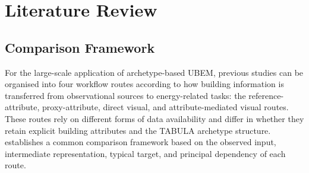 \chapter{Literature Review}
\label{ch:literature_review}

\section{Comparison Framework}
\label{sec:comparison_framework}

For the large-scale application of archetype-based \ac{UBEM}, previous studies can be organised into four workflow routes according to how building information is transferred from observational sources to energy-related tasks: the reference-attribute, proxy-attribute, direct visual, and attribute-mediated visual routes.
These routes rely on different forms of data availability and differ in whether they retain explicit building attributes and the TABULA archetype structure.
 establishes a common comparison framework based on the observed input, intermediate representation, typical target, and principal dependency of each route.

